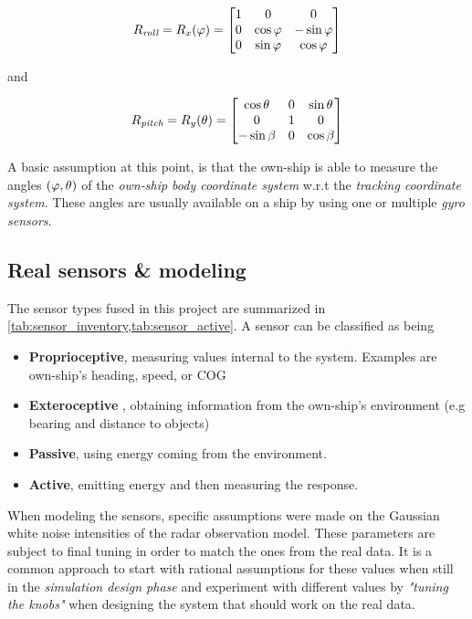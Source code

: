 \begin{description}
\begin{equation}
R_{\textit{roll}}= R_x({\varphi}) =
\begin{bmatrix}
1 &0 &0\\
0 &\cos{\varphi} &-\sin {\varphi}\\
0 &\sin {\varphi} &\cos {\varphi}
\end{bmatrix}
\end{equation}


and


\begin{equation}
R_{\textit{pitch}}= R_y({\theta}) =
\begin{bmatrix}
\cos{\theta} &0 &\sin {\theta}\\
0 &1 &0\\
-\sin \beta &0 &\cos\beta
\end{bmatrix}
\end{equation}

A basic assumption at this point, is that the own-ship is able to measure the angles $({\varphi},{\theta})$ of the \emph{own-ship body coordinate system} w.r.t the \emph{tracking coordinate system}. These angles are usually available on a ship by using one or multiple \emph{gyro sensors}.

\end{description}

\subsection{Real sensors \& modeling}

The sensor types fused in this project are summarized in \cref{tab:sensor_inventory,tab:sensor_active}. A sensor can be classified as being

\begin{itemize}
\item\textbf{Proprioceptive}, measuring values internal to
	the system. Examples are own-ship's heading, speed, or COG
	\item\textbf{Exteroceptive} , obtaining information from the own-ship's environment (e.g bearing and distance to objects)
	\item\textbf{Passive}, using energy coming from the
	environment. 
	\item\textbf{Active}, emitting energy and then measuring the response.
\end{itemize}
 

When modeling the sensors, specific assumptions were made on the Gaussian white noise intensities of the radar observation model. These parameters are subject to final tuning in order to match the ones from the real data. It is a common approach to start with rational assumptions for these values when still in the \emph{simulation design phase} and  experiment with different values by \emph{"tuning the knobs"} when designing the system that should work on the real data. 


